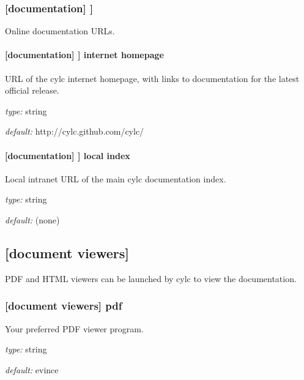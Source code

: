 \subsubsection[{[[}urls{]]}]{[documentation] \textrightarrow [[urls]]}

Online documentation URLs.

\paragraph[internet homepage]{[documentation] \textrightarrow [[urls]] \textrightarrow internet homepage }

URL of the cylc internet homepage, with links to documentation for the
latest official release.

\begin{myitemize}
\item {\em type:} string
\item {\em default:} http://cylc.github.com/cylc/
\end{myitemize}

\paragraph[local index]{[documentation] \textrightarrow [[urls]] \textrightarrow local index}

Local intranet URL of the main cylc documentation index.

\begin{myitemize}
\item {\em type:} string
\item {\em default:} (none)
\end{myitemize}

\subsection{[document viewers]}

PDF and HTML viewers can be launched by cylc to view the documentation.

\subsubsection[pdf]{[document viewers] \textrightarrow pdf}

Your preferred PDF viewer program.

\begin{myitemize}
\item {\em type:} string
\item {\em default:} evince
\end{myitemize}

